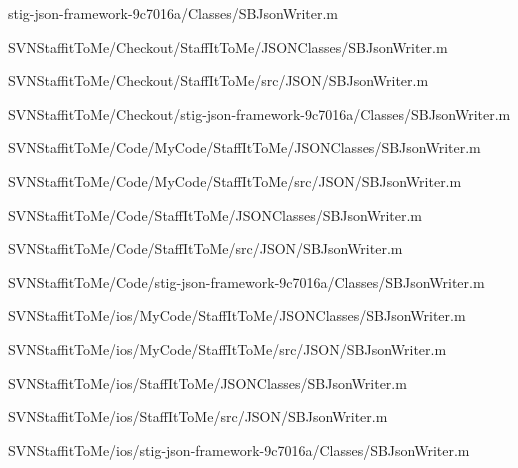 \begin{DoxyCompactItemize}
stig-\/json-\/framework-\/9c7016a/\-Classes/\-S\-B\-Json\-Writer.\-m\item 
\-S\-V\-N\-Staffit\-To\-Me/\-Checkout/\-Staff\-It\-To\-Me/\-J\-S\-O\-N\-Classes/\-S\-B\-Json\-Writer.\-m\item 
\-S\-V\-N\-Staffit\-To\-Me/\-Checkout/\-Staff\-It\-To\-Me/src/\-J\-S\-O\-N/\-S\-B\-Json\-Writer.\-m\item 
\-S\-V\-N\-Staffit\-To\-Me/\-Checkout/stig-\/json-\/framework-\/9c7016a/\-Classes/\-S\-B\-Json\-Writer.\-m\item 
\-S\-V\-N\-Staffit\-To\-Me/\-Code/\-My\-Code/\-Staff\-It\-To\-Me/\-J\-S\-O\-N\-Classes/\-S\-B\-Json\-Writer.\-m\item 
\-S\-V\-N\-Staffit\-To\-Me/\-Code/\-My\-Code/\-Staff\-It\-To\-Me/src/\-J\-S\-O\-N/\-S\-B\-Json\-Writer.\-m\item 
\-S\-V\-N\-Staffit\-To\-Me/\-Code/\-Staff\-It\-To\-Me/\-J\-S\-O\-N\-Classes/\-S\-B\-Json\-Writer.\-m\item 
\-S\-V\-N\-Staffit\-To\-Me/\-Code/\-Staff\-It\-To\-Me/src/\-J\-S\-O\-N/\-S\-B\-Json\-Writer.\-m\item 
\-S\-V\-N\-Staffit\-To\-Me/\-Code/stig-\/json-\/framework-\/9c7016a/\-Classes/\-S\-B\-Json\-Writer.\-m\item 
\-S\-V\-N\-Staffit\-To\-Me/ios/\-My\-Code/\-Staff\-It\-To\-Me/\-J\-S\-O\-N\-Classes/\-S\-B\-Json\-Writer.\-m\item 
\-S\-V\-N\-Staffit\-To\-Me/ios/\-My\-Code/\-Staff\-It\-To\-Me/src/\-J\-S\-O\-N/\-S\-B\-Json\-Writer.\-m\item 
\-S\-V\-N\-Staffit\-To\-Me/ios/\-Staff\-It\-To\-Me/\-J\-S\-O\-N\-Classes/\-S\-B\-Json\-Writer.\-m\item 
\-S\-V\-N\-Staffit\-To\-Me/ios/\-Staff\-It\-To\-Me/src/\-J\-S\-O\-N/\-S\-B\-Json\-Writer.\-m\item 
\-S\-V\-N\-Staffit\-To\-Me/ios/stig-\/json-\/framework-\/9c7016a/\-Classes/\-S\-B\-Json\-Writer.\-m\end{DoxyCompactItemize}
